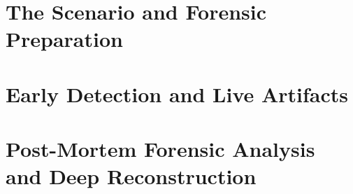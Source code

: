 \documentclass[10pt,twoside,openright]{book}
\begin{document}
\frontmatter
\pagestyle{plain}


\cleardoublepage


\cleardoublepage


\cleardoublepage


\cleardoublepage


\cleardoublepage


\cleardoublepage

\tableofcontents
\cleardoublepage

\mainmatter
\pagestyle{fancy}

\part{The Scenario and Forensic Preparation}




\part{Early Detection and Live Artifacts}





\part{Post-Mortem Forensic Analysis and Deep Reconstruction}









\end{document}
